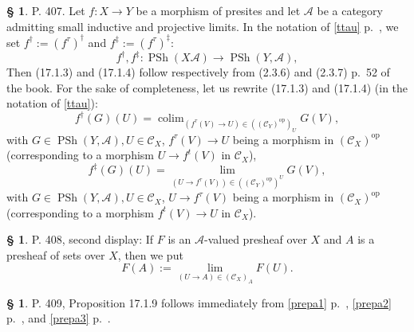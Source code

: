 \documentclass[12pt]{article}%
\newtheorem{prop}[thm]{Proposition}
\theoremstyle{remark}
\theoremstyle{definition}
\newtheorem{s}[thm]{\S}%
\newcommand{\A}{\mathcal A}
\newcommand{\C}{\mathcal C}
\DeclareMathOperator*{\colim}{colim}
\DeclareMathOperator{\op}{op}
\DeclareMathOperator{\PSh}{PSh}
\begin{document}
%

\begin{s}\label{fdagger} 
P. 407. Let $f:X\to Y$ be a morphism of presites and let $\A$ be a category admitting small inductive and projective limits. In the notation of \eqref{ttau} p.~\pageref{ttau}, we set $f^\dagger:=(f^\tau)^\dagger$ and $f^\ddagger:=(f^\tau)^\ddagger$: 
$$
f^\dagger,f^\ddagger:\PSh(X\A)\to\PSh(Y,\A),
$$
Then (17.1.3) and (17.1.4) follow respectively from (2.3.6) and (2.3.7) p.~52 of the book. For the sake of completeness, let us rewrite (17.1.3) and (17.1.4) (in the notation of \eqref{ttau}):
%
\begin{equation}\label{1713}
f^\dagger(G)(U)=\colim_{(f^\tau(V)\to U)\in((\C_Y)^{\op})_U}G(V),
\end{equation}
%
with $G\in\PSh(Y,\A),U\in\C_X$, $f^\tau(V)\to U$ being a morphism in $(\C_X)^{\op}$ (corresponding to a morphism $U\to f^t(V)$ in $\C_X$), 
%
\begin{equation}\label{1714}
f^\ddagger(G)(U)=\lim_{(U\to f^\tau(V))\in((\C_Y)^{\op})^U}G(V),
\end{equation}
%
with $G\in\PSh(Y,\A),U\in\C_X$, $U\to f^\tau(V)$ being a morphism in $(\C_X)^{\op}$ (corresponding to a morphism $f^t(V)\to U$ in $\C_X$).

\end{s}

%

\begin{s}
P. 408, second display: If $F$ is an $\A$-valued presheaf over $X$ and $A$ is a presheaf of sets over $X$, then we put 
\begin{equation}\label{408}
F(A):=\lim_{(U\to A)\in(\C_X)_A}F(U).
\end{equation}
\end{s}

%

\begin{s}
P. 409, Proposition 17.1.9 follows immediately from \eqref{prepa1} p.~\pageref{prepa1}, \eqref{prepa2} p.~\pageref{prepa2}, and \eqref{prepa3} p.~\pageref{prepa3}.
\end{s}

%
\end{document}
